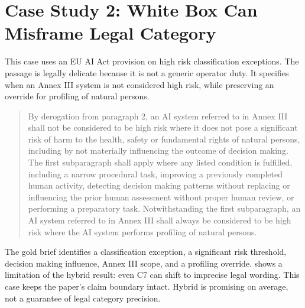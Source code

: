 \documentclass{article}
\begin{document}
\section{Case Study 2: White Box Can Misframe Legal Category}

This case uses an EU AI Act provision on high risk classification exceptions. The passage is legally delicate because it is not a generic operator duty. It specifies when an Annex III system is not considered high risk, while preserving an override for profiling of natural persons.

\begin{quote}
\small
By derogation from paragraph 2, an AI system referred to in Annex III shall not be considered to be high risk where it does not pose a significant risk of harm to the health, safety or fundamental rights of natural persons, including by not materially influencing the outcome of decision making. The first subparagraph shall apply where any listed condition is fulfilled, including a narrow procedural task, improving a previously completed human activity, detecting decision making patterns without replacing or influencing the prior human assessment without proper human review, or performing a preparatory task. Notwithstanding the first subparagraph, an AI system referred to in Annex III shall always be considered to be high risk where the AI system performs profiling of natural persons.
\end{quote}

The gold brief identifies a classification exception, a significant risk threshold, decision making influence, Annex III scope, and a profiling override.  shows a limitation of the hybrid result: even C7 can shift to imprecise legal wording. This case keeps the paper's claim boundary intact. Hybrid is promising on average, not a guarantee of legal category precision.
\end{document}
